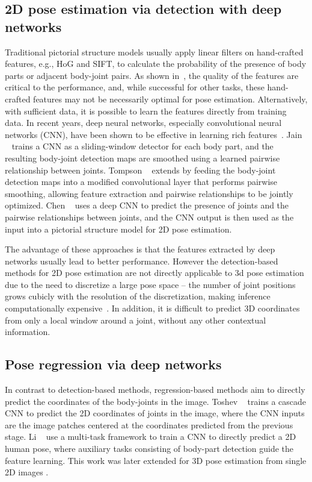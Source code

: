 \documentclass[10pt,twocolumn,letterpaper]{article}
\begin{document}
\subsection{2D pose estimation via detection with deep networks}
Traditional pictorial structure models usually apply linear filters on hand-crafted features, e.g., HoG and SIFT, to calculate the probability of the presence of body parts or adjacent body-joint pairs.
As shown in~\cite{Eichner2009BMVC}, the quality of the features are critical to the performance, and, while successful for other tasks, these hand-crafted features may not be necessarily optimal for pose estimation.
Alternatively, with sufficient data, it is possible to learn the features directly from training data.
In recent years, deep neural networks, especially convolutional neural networks (CNN), have been shown to be effective in learning rich features~\cite{Ali2014, Alex2012}.
Jain \etal~\cite{arjun2014iclr} trains a CNN as a sliding-window detector for each body part, 
and the resulting body-joint detection maps are smoothed using a learned pairwise relationship between joints.
Tompson \etal~\cite{Jonathan2014} extends \cite{arjun2014iclr} by feeding the body-joint detection maps into a modified convolutional layer that performs pairwise smoothing, allowing  feature extraction and pairwise relationships to be jointly optimized.
Chen \etal~\cite{Chen_NIPS14}  uses a deep CNN to predict the presence of joints and the pairwise relationships between joints, and the CNN output is then used as the input into a pictorial structure model for 2D pose estimation.


The advantage of these approaches is that the features extracted by deep networks usually lead to better performance.
However the detection-based methods for 2D pose estimation are not directly applicable to 3d pose estimation due to the need to discretize a large pose space -- the number of joint positions grows cubicly with the resolution of the discretization, making inference computationally expensive~\cite{Burenius2013}.
In addition, it is difficult to predict 3D coordinates from only a local window around a joint, without any other contextual information.






\subsection{Pose regression via deep networks}

In contrast to detection-based methods, regression-based methods aim to directly predict the coordinates of the body-joints in the image.
Toshev \etal~\cite{deeppose2014} trains a cascade CNN to predict the 2D coordinates of joints in the image, where the CNN inputs are the image patches centered at the coordinates predicted from the previous stage.
Li \etal~\cite{hmlpeijcv} use a multi-task framework to train a CNN to directly predict a 2D human pose, where auxiliary tasks consisting of body-part detection guide the feature learning.
This work was later extended for 3D pose estimation from single 2D images  \cite{accv2014}.
\end{document}
